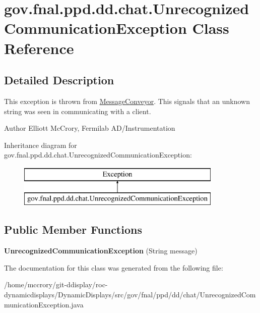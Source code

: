 \hypertarget{classgov_1_1fnal_1_1ppd_1_1dd_1_1chat_1_1UnrecognizedCommunicationException}{\section{gov.\-fnal.\-ppd.\-dd.\-chat.\-Unrecognized\-Communication\-Exception Class Reference}
\label{classgov_1_1fnal_1_1ppd_1_1dd_1_1chat_1_1UnrecognizedCommunicationException}
}


\subsection{Detailed Description}
This exception is thrown from \hyperlink{classgov_1_1fnal_1_1ppd_1_1dd_1_1chat_1_1MessageConveyor}{Message\-Conveyor}. This signals that an unknown string was seen in communicating with a client.

\begin{DoxyAuthor}{Author}
Elliott Mc\-Crory, Fermilab A\-D/\-Instrumentation 
\end{DoxyAuthor}
Inheritance diagram for gov.\-fnal.\-ppd.\-dd.\-chat.\-Unrecognized\-Communication\-Exception\-:\begin{figure}[H]
\begin{center}
\leavevmode
\includegraphics[height=2.000000cm]{classgov_1_1fnal_1_1ppd_1_1dd_1_1chat_1_1UnrecognizedCommunicationException}
\end{center}
\end{figure}
\subsection*{Public Member Functions}
\begin{DoxyCompactItemize}
\item 
\hypertarget{classgov_1_1fnal_1_1ppd_1_1dd_1_1chat_1_1UnrecognizedCommunicationException_a3f3699518a3863ec7f26d50de241a8ba}{{\bfseries Unrecognized\-Communication\-Exception} (String message)}\label{classgov_1_1fnal_1_1ppd_1_1dd_1_1chat_1_1UnrecognizedCommunicationException_a3f3699518a3863ec7f26d50de241a8ba}

\end{DoxyCompactItemize}


The documentation for this class was generated from the following file\-:\begin{DoxyCompactItemize}
\item 
/home/mccrory/git-\/ddisplay/roc-\/dynamicdisplays/\-Dynamic\-Displays/src/gov/fnal/ppd/dd/chat/Unrecognized\-Communication\-Exception.\-java\end{DoxyCompactItemize}
